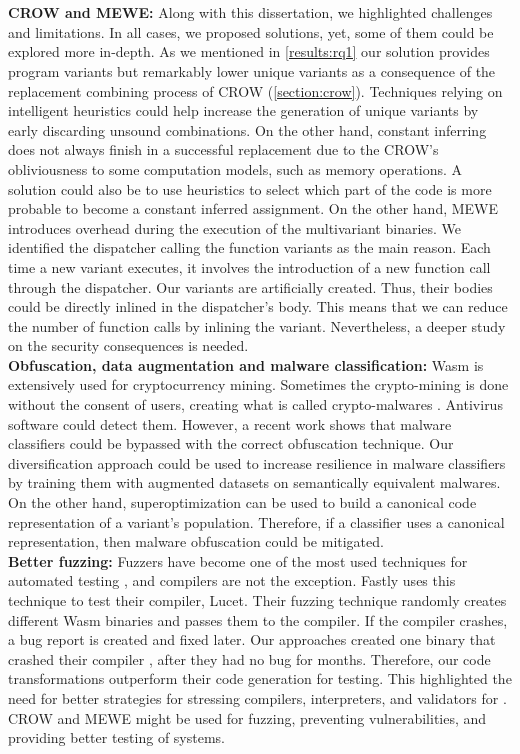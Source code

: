\\
\\

\textbf{CROW and MEWE:} Along with this dissertation, we highlighted challenges and limitations. In all cases, we proposed solutions, yet, some of them could be explored more in-depth.
As we mentioned in \autoref{results:rq1} our solution provides program variants but remarkably lower unique variants as a consequence of the replacement combining process of CROW (\autoref{section:crow}). 
Techniques relying on intelligent heuristics could help increase the generation of unique variants by early discarding unsound combinations.
On the other hand, constant inferring does not always finish in a successful replacement due to the CROW's obliviousness to some computation models, such as memory operations. 
A solution could also be to use heuristics to select which part of the code is more probable to become a constant inferred assignment.
On the other hand, MEWE introduces overhead during the execution of the multivariant binaries.
We identified the dispatcher calling the function variants as the main reason.
Each time a new variant executes, it involves the introduction of a new function call through the dispatcher.
Our variants are artificially created. Thus, their bodies could be directly inlined in the dispatcher's body.
This means that we can reduce the number of function calls by inlining the variant.
Nevertheless, a deeper study on the security consequences is needed.
\\

\textbf{Obfuscation, data augmentation and malware classification:}
Wasm is extensively used for cryptocurrency mining. 
Sometimes the crypto-mining is done without the consent of users, creating what is called crypto-malwares \cite{Hilbig2021AnES}.
Antivirus software could detect them. 
However, a recent work \cite{10.1145/3507657.3528560} shows that malware classifiers could be bypassed with the correct obfuscation technique.
Our diversification approach could be used to increase resilience in malware classifiers by training them with augmented datasets on semantically equivalent malwares.
On the other hand, superoptimization can be used to build a canonical code representation of a variant's population.
Therefore, if a classifier uses a canonical representation, then malware obfuscation could be mitigated.
\\

\textbf{Better fuzzing:}
Fuzzers have become one of the most used techniques for automated testing \cite{zalewski2017american}, and compilers are not the exception.
Fastly uses this technique to test their compiler, Lucet.
Their fuzzing technique randomly creates different Wasm binaries and passes them to the compiler. If the compiler crashes, a bug report is created and fixed later.
Our approaches created one binary that crashed their compiler \cite{CVE}, after they had no bug for months.
Therefore, our code transformations outperform their code generation for testing. 
This highlighted the need for better strategies for stressing compilers, interpreters, and validators for \wasm.
CROW and MEWE might be used for fuzzing, preventing vulnerabilities, and providing better testing of systems.


